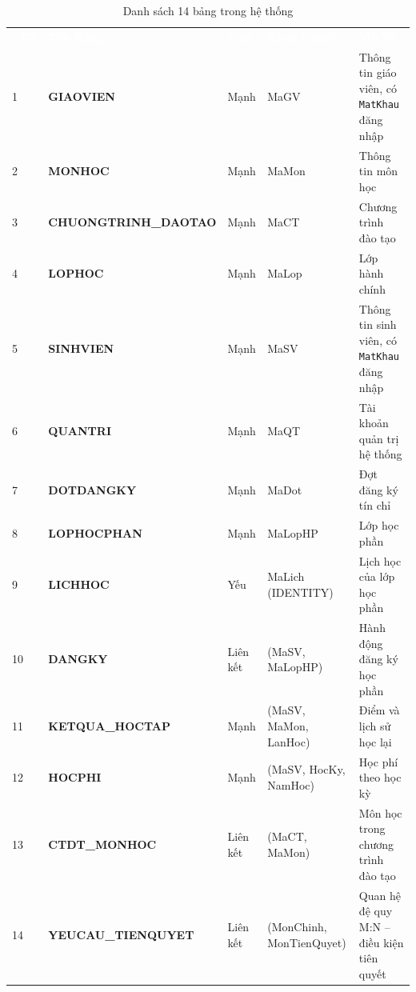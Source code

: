 \documentclass[13pt, a4paper]{article}
\begin{document}
\begin{table}[H]
\centering
\renewcommand{\arraystretch}{1.35}
\begin{tabular}{>{\centering}p{0.8cm} >{\bfseries}p{3.6cm} p{2.2cm} p{3cm} p{4cm}}
  \rowcolor{tableheadbg}
  \textcolor{white}{\textbf{STT}} &
  \textcolor{white}{Tên Bảng} &
  \textcolor{white}{\textbf{Loại}} &
  \textcolor{white}{\textbf{Khoá Chính}} &
  \textcolor{white}{\textbf{Mô Tả}} \\
  \rowcolor{white}
  1 & GIAOVIEN             & Mạnh     & MaGV            & Thông tin giáo viên, có \texttt{MatKhau} đăng nhập \\
  \rowcolor{tablerowalt}
  2 & MONHOC               & Mạnh     & MaMon           & Thông tin môn học \\
  \rowcolor{white}
  3 & CHUONGTRINH\_DAOTAO  & Mạnh     & MaCT            & Chương trình đào tạo \\
  \rowcolor{tablerowalt}
  4 & LOPHOC               & Mạnh     & MaLop           & Lớp hành chính \\
  \rowcolor{white}
  5 & SINHVIEN             & Mạnh     & MaSV            & Thông tin sinh viên, có \texttt{MatKhau} đăng nhập \\
  \rowcolor{tablerowalt}
  6 & QUANTRI              & Mạnh     & MaQT            & Tài khoản quản trị hệ thống \\
  \rowcolor{white}
  7 & DOTDANGKY            & Mạnh     & MaDot           & Đợt đăng ký tín chỉ \\
  \rowcolor{tablerowalt}
  8 & LOPHOCPHAN           & Mạnh     & MaLopHP         & Lớp học phần \\
  \rowcolor{white}
  9 & LICHHOC              & Yếu      & MaLich (IDENTITY) & Lịch học của lớp học phần \\
  \rowcolor{tablerowalt}
  10 & DANGKY              & Liên kết & (MaSV, MaLopHP) & Hành động đăng ký học phần \\
  \rowcolor{white}
  11 & KETQUA\_HOCTAP      & Mạnh     & (MaSV, MaMon, LanHoc) & Điểm và lịch sử học lại \\
  \rowcolor{tablerowalt}
  12 & HOCPHI              & Mạnh     & (MaSV, HocKy, NamHoc) & Học phí theo học kỳ \\
  \rowcolor{white}
  13 & CTDT\_MONHOC        & Liên kết & (MaCT, MaMon)   & Môn học trong chương trình đào tạo \\
  \rowcolor{tablerowalt}
  14 & YEUCAU\_TIENQUYET   & Liên kết & (MonChinh, MonTienQuyet) & Quan hệ đệ quy M:N -- điều kiện tiên quyết \\
\end{tabular}
\caption{Danh sách 14 bảng trong hệ thống}
\end{table}
\end{document}
